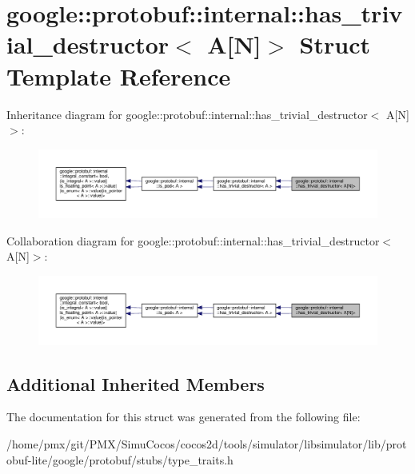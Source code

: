 \hypertarget{structgoogle_1_1protobuf_1_1internal_1_1has__trivial__destructor_3_01A[N]_4}{}\section{google\+:\+:protobuf\+:\+:internal\+:\+:has\+\_\+trivial\+\_\+destructor$<$ A\mbox{[}N\mbox{]}$>$ Struct Template Reference}
\label{structgoogle_1_1protobuf_1_1internal_1_1has__trivial__destructor_3_01A[N]_4}


Inheritance diagram for google\+:\+:protobuf\+:\+:internal\+:\+:has\+\_\+trivial\+\_\+destructor$<$ A\mbox{[}N\mbox{]}$>$\+:
\nopagebreak
\begin{figure}[H]
\begin{center}
\leavevmode
\includegraphics[width=350pt]{structgoogle_1_1protobuf_1_1internal_1_1has__trivial__destructor_3_01A[N]_4__inherit__graph}
\end{center}
\end{figure}


Collaboration diagram for google\+:\+:protobuf\+:\+:internal\+:\+:has\+\_\+trivial\+\_\+destructor$<$ A\mbox{[}N\mbox{]}$>$\+:
\nopagebreak
\begin{figure}[H]
\begin{center}
\leavevmode
\includegraphics[width=350pt]{structgoogle_1_1protobuf_1_1internal_1_1has__trivial__destructor_3_01A[N]_4__coll__graph}
\end{center}
\end{figure}
\subsection*{Additional Inherited Members}


The documentation for this struct was generated from the following file\+:\begin{DoxyCompactItemize}
\item 
/home/pmx/git/\+P\+M\+X/\+Simu\+Cocos/cocos2d/tools/simulator/libsimulator/lib/protobuf-\/lite/google/protobuf/stubs/type\+\_\+traits.\+h\end{DoxyCompactItemize}
